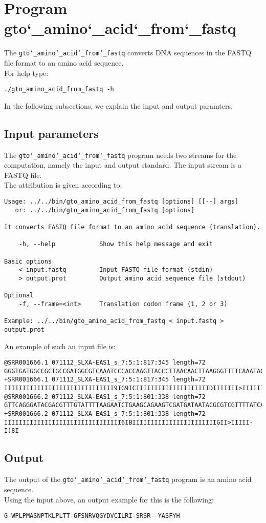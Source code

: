 \section{Program gto\char`_amino\char`_acid\char`_from\char`_fastq}
The \texttt{gto\char`_amino\char`_acid\char`_from\char`_fastq} converts DNA sequences in the FASTQ file format to an amino acid sequence.\\
For help type:
\begin{lstlisting}
./gto_amino_acid_from_fastq -h
\end{lstlisting}
In the following subsections, we explain the input and output paramters.

\subsection*{Input parameters}

The \texttt{gto\char`_amino\char`_acid\char`_from\char`_fastq} program needs two streams for the computation, namely the input and output standard. The input stream is a FASTQ file.\\
The attribution is given according to:
\begin{lstlisting}
Usage: ../../bin/gto_amino_acid_from_fastq [options] [[--] args]
   or: ../../bin/gto_amino_acid_from_fastq [options]

It converts FASTQ file format to an amino acid sequence (translation).

    -h, --help            Show this help message and exit

Basic options
    < input.fastq         Input FASTQ file format (stdin)
    > output.prot         Output amino acid sequence file (stdout)

Optional
    -f, --frame=<int>     Translation codon frame (1, 2 or 3)

Example: ../../bin/gto_amino_acid_from_fastq < input.fastq > output.prot
\end{lstlisting}
An example of such an input file is:
\begin{lstlisting}
@SRR001666.1 071112_SLXA-EAS1_s_7:5:1:817:345 length=72
GGGTGATGGCCGCTGCCGATGGCGTCAAATCCCACCAAGTTACCCTTAACAACTTAAGGGTTTTCAAATAGA
+SRR001666.1 071112_SLXA-EAS1_s_7:5:1:817:345 length=72
IIIIIIIIIIIIIIIIIIIIIIIIIIIIII9IG9ICIIIIIIIIIIIIIIIIIIIIDIIIIIII>IIIIII/
@SRR001666.2 071112_SLXA-EAS1_s_7:5:1:801:338 length=72
GTTCAGGGATACGACGTTTGTATTTTAAGAATCTGAAGCAGAAGTCGATGATAATACGCGTCGTTTTATCAT
+SRR001666.2 071112_SLXA-EAS1_s_7:5:1:801:338 length=72
IIIIIIIIIIIIIIIIIIIIIIIIIIIIIIII6IBIIIIIIIIIIIIIIIIIIIIIIIGII>IIIII-I)8I
\end{lstlisting}

\subsection*{Output}

The output of the \texttt{gto\char`_amino\char`_acid\char`_from\char`_fastq} program is an amino acid sequence.\\
Using the input above, an output example for this is the following:
\begin{lstlisting}
G-WPLPMASNPTKLPLTT-GFSNRVQGYDVCILRI-SRSR--YASFYH
\end{lstlisting}
